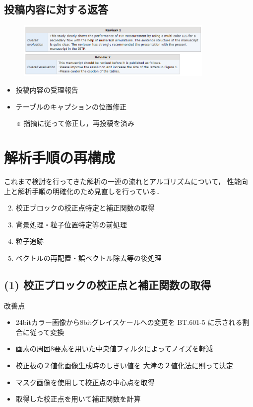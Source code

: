 \documentclass[twocolumn,a4j]{jsarticle}
\begin{document}
\subsection{投稿内容に対する返答}
\begin{figure}[htbp]
  \footnotesize
  \includegraphics[width=95mm]{../images/reviews.png}
\end{figure}

\begin{itemize}
  \item 投稿内容の受理報告
  \item テーブルのキャプションの位置修正
  \item [※] 指摘に従って修正し，再投稿を済み
\end{itemize}

\section{解析手順の再構成}
これまで検討を行ってきた解析の一連の流れとアルゴリズムについて，
性能向上と解析手順の明確化のため見直しを行っている．

\begin{enumerate}[(1)]
  \item [] \textgt{[ 全体の流れ ]}
  \item 校正ブロックの校正点特定と補正関数の取得
  \item 背景処理・粒子位置特定等の前処理
  \item 粒子追跡
  \item ベクトルの再配置・誤ベクトル除去等の後処理
\end{enumerate}

\subsection{(1) 校正プロックの校正点と補正関数の取得}
改善点
\begin{itemize}
  \item 24bitカラー画像から8bitグレイスケールへの変更を
        BT.601-5 に示される割合に従って変換
  \item 画素の周囲8要素を用いた中央値フィルタによってノイズを軽減
  \item 校正板の２値化画像生成時のしきい値を
        大津の２値化法に則って決定
  \item マスク画像を使用して校正点の中心点を取得
  \item 取得した校正点を用いて補正関数を計算
\end{itemize}
\end{document}
